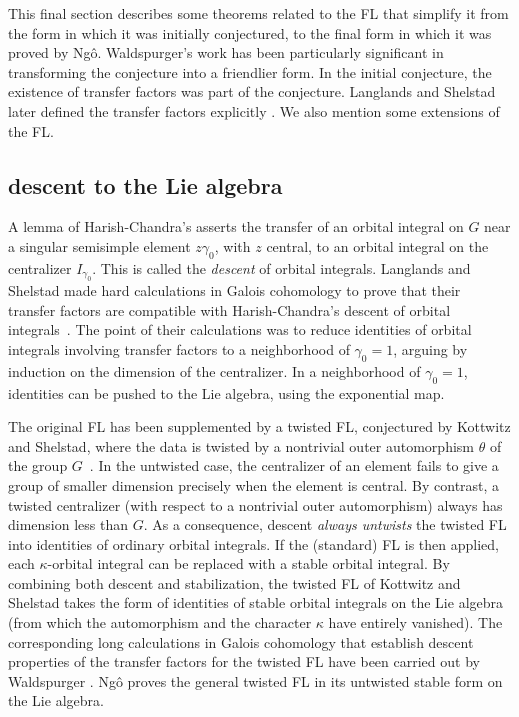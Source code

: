 \documentclass[brochure,english,12pt]{bourbaki}
\theoremstyle{plain}
\begin{document}
 This final section describes some theorems related to the FL that
 simplify it from the form in which it was initially conjectured, to
 the final form in which it was proved by Ng\^o.  Waldspurger's work
 has been particularly significant in transforming the conjecture into
 a friendlier form.  In the initial conjecture, the existence
 of transfer factors was part of the conjecture.  Langlands and
 Shelstad later defined the transfer factors explicitly
 \cite{LS:1987}.  We also mention some extensions of the FL.

\subsection{descent to the Lie algebra}\label{sec:descent}

A lemma of Harish-Chandra's asserts the transfer of an orbital
integral on $G$ near a singular semisimple element $z\gamma_0$, with
$z$ central, to an orbital integral on the centralizer $I_{\gamma_0}$.
This is called the {\it descent} of orbital integrals.  Langlands and
Shelstad made hard calculations in Galois cohomology to prove that
their transfer factors are compatible with Harish-Chandra's descent of
orbital integrals~\cite{LS:1990}.  The point of their calculations was
to reduce identities of orbital integrals involving transfer factors
to a neighborhood of $\gamma_0=1$, arguing by induction on the
dimension of the centralizer.  In a neighborhood of $\gamma_0=1$, identities can
be pushed to the Lie algebra, using the exponential map.

The original FL has been supplemented by a twisted FL, conjectured by
Kottwitz and Shelstad, where the data is twisted by a nontrivial outer
automorphism $\theta$ of the group $G$~\cite{KS:1999}.  In the
untwisted case, the centralizer of an element fails to give a group of
smaller dimension precisely when the element is central.  By contrast,
a twisted centralizer (with respect to a nontrivial outer
automorphism) always has dimension less than $G$.  As a consequence,
descent {\it always untwists} the twisted FL into identities of
ordinary orbital integrals.  If the (standard) FL is then applied,
each $\kappa$-orbital integral can be replaced with a stable orbital
integral.  By combining both descent and stabilization, the twisted FL
of Kottwitz and Shelstad takes the form of identities of stable
orbital integrals on the Lie algebra (from which the automorphism and
the character $\kappa$ have entirely vanished).  The corresponding
long calculations in Galois cohomology that establish descent
properties of the transfer factors for the twisted FL have been
carried out by Waldspurger \cite{Wald:2008}.  Ng\^o proves the general
twisted FL in its untwisted stable form on the Lie algebra.
\end{document}
